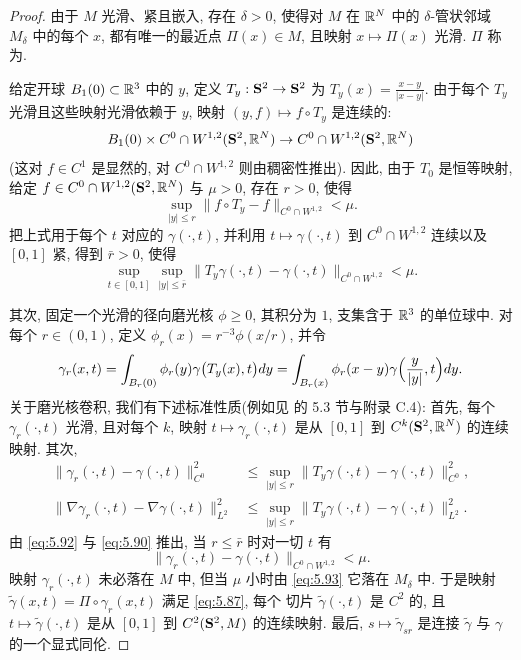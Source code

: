 \begin{proof}
由于 $M$ 光滑、紧且嵌入, 存在 $\delta>0$, 使得对 $M$ 在 $\mathbb{R}^N$ 中的
$\delta$-管状邻域 $M_\delta$ 中的每个 $x$, 都有唯一的最近点
$\Pi(x)\in M$, 且映射 $x\mapsto\Pi(x)$ 光滑. $\Pi$ 称为.

给定开球 $B_1(0)\subset\mathbb{R}^3$ 中的 $y$, 定义 $T_y:\mathbf{S}^2\to\mathbf{S}^2$ 为
$T_y(x)=\frac{x-y}{|x-y|}$. 由于每个 $T_y$ 光滑且这些映射光滑依赖于
$y$, 映射 $(y,f)\mapsto f\circ T_y$ 是连续的:
\begin{equation}
B_1(0)\times C^0\cap W^{1,2}(\mathbf{S}^2,\mathbb{R}^N)
\to C^0\cap W^{1,2}(\mathbf{S}^2,\mathbb{R}^N)
\label{eq:5.88}
\end{equation}
(这对 $f\in C^1$ 是显然的, 对 $C^0\cap W^{1,2}$ 则由稠密性推出). 因此,
由于 $T_0$ 是恒等映射, 给定 $f\in C^0\cap W^{1,2}(\mathbf{S}^2,\mathbb{R}^N)$ 与
$\mu>0$, 存在 $r>0$, 使得
\begin{equation}
\sup_{|y|\leq r}\|f\circ T_y-f\|_{C^0\cap W^{1,2}}<\mu.
\label{eq:5.89}
\end{equation}
把上式用于每个 $t$ 对应的 $\gamma(\cdot,t)$, 并利用
$t\mapsto\gamma(\cdot,t)$ 到 $C^0\cap W^{1,2}$ 连续以及 $[0,1]$ 紧,
得到 $\bar{r}>0$, 使得
\begin{equation}
\sup_{t\in[0,1]}\sup_{|y|\leq\bar{r}}
\|T_y\gamma(\cdot,t)-\gamma(\cdot,t)\|_{C^0\cap W^{1,2}}<\mu.
\label{eq:5.90}
\end{equation}

其次, 固定一个光滑的径向磨光核 $\phi\geq 0$, 其积分为 $1$, 支集含于
$\mathbb{R}^3$ 的单位球中. 对每个 $r\in(0,1)$, 定义
$\phi_r(x)=r^{-3}\phi(x/r)$, 并令
\begin{equation}
\gamma_r(x,t)=\int_{B_r(0)}\phi_r(y)\gamma\bigl(T_y(x),t\bigr)dy
=\int_{B_r(x)}\phi_r(x-y)\gamma\Bigl(\frac{y}{|y|},t\Bigr)dy.
\label{eq:5.91}
\end{equation}
关于磨光核卷积, 我们有下述标准性质(例如见 \cite{Ev} 的 5.3 节与附录
C.4): 首先, 每个 $\gamma_r(\cdot,t)$ 光滑, 且对每个 $k$, 映射
$t\mapsto\gamma_r(\cdot,t)$ 是从 $[0,1]$ 到 $C^k(\mathbf{S}^2,\mathbb{R}^N)$ 的连续
映射. 其次,
\begin{equation}
\begin{aligned}
\|\gamma_r(\cdot,t)-\gamma(\cdot,t)\|_{C^0}^2
&\leq\sup_{|y|\leq r}\|T_y\gamma(\cdot,t)-\gamma(\cdot,t)\|_{C^0}^2,\\
\|\nabla\gamma_r(\cdot,t)-\nabla\gamma(\cdot,t)\|_{L^2}^2
&\leq\sup_{|y|\leq r}\|T_y\gamma(\cdot,t)-\gamma(\cdot,t)\|_{L^2}^2.
\end{aligned}
\label{eq:5.92}
\end{equation}
由 \eqref{eq:5.92} 与 \eqref{eq:5.90} 推出, 当 $r\leq\bar{r}$ 时对一切
$t$ 有
\begin{equation}
\|\gamma_r(\cdot,t)-\gamma(\cdot,t)\|_{C^0\cap W^{1,2}}<\mu.
\label{eq:5.93}
\end{equation}
映射 $\gamma_r(\cdot,t)$ 未必落在 $M$ 中, 但当 $\mu$ 小时由
\eqref{eq:5.93} 它落在 $M_\delta$ 中. 于是映射
$\tilde{\gamma}(x,t)=\Pi\circ\gamma_r(x,t)$ 满足 \eqref{eq:5.87}, 每个
切片 $\tilde{\gamma}(\cdot,t)$ 是 $C^2$ 的, 且
$t\mapsto\tilde{\gamma}(\cdot,t)$ 是从 $[0,1]$ 到
$C^2(\mathbf{S}^2,M)$ 的连续映射. 最后, $s\mapsto\tilde{\gamma}_{sr}$ 是连接
$\tilde{\gamma}$ 与 $\gamma$ 的一个显式同伦.
\end{proof}

